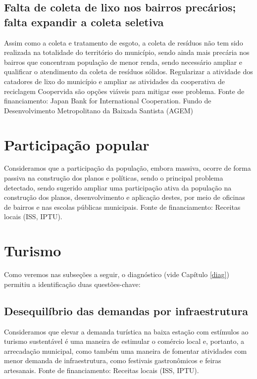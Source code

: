 	\subsection{Falta de coleta de lixo nos bairros precários; falta expandir a coleta seletiva}

	Assim como a coleta e tratamento de esgoto, a coleta de resíduos não tem sido realizada na totalidade do território do município, sendo ainda mais precária nos bairros que concentram população de menor renda, sendo necessário ampliar e qualificar o atendimento da coleta de resíduos sólidos. Regularizar a atividade dos catadores de lixo do município e ampliar as atividades da cooperativa de reciclagem Coopervida são opções viáveis para mitigar esse problema. 
    Fonte de financiamento: Japan Bank for International Cooperation. Fundo de Desenvolvimento Metropolitano da Baixada Santista (AGEM)
    
	
	\section{Participação popular}
	
	Consideramos que a participação da população, embora massiva, ocorre de forma passiva na construção dos planos e políticas, sendo o principal problema detectado, sendo sugerido ampliar uma participação ativa da população na construção dos planos, desenvolvimento e aplicação destes, por meio de oficinas de bairros e nas escolas públicas municipais.
    Fonte de financiamento: Receitas locais (ISS, IPTU).   
	
	\section{Turismo}
	
	Como veremos nas subseções a seguir, o diagnóstico (vide Capítulo \ref{diag}) permitiu a identificação duas questões-chave:

	\subsection{Desequilíbrio das demandas por infraestrutura}
	
	Consideramos que elevar a demanda turística na baixa estação com estímulos ao turismo sustentável é uma maneira de estimular o comércio local e, portanto, a arrecadação municipal, como também uma maneira de fomentar atividades com menor demanda de infraestrutura, como festivais gastronômicos e feiras artesanais. 
    Fonte de financiamento:  Receitas locais (ISS, IPTU).
	
